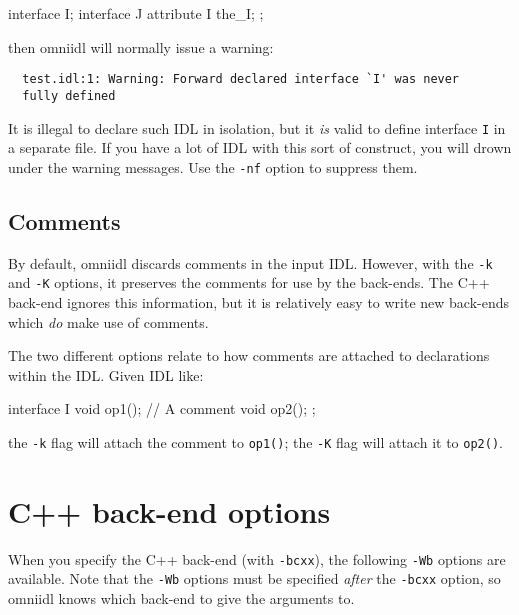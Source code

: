 \documentclass[11pt,twoside,a4paper]{book}
\newcommand{\intf}[1]{\texttt{#1}}
\newcommand{\op}[1]{\texttt{#1()}}
\newcommand{\cmdline}[1]{\texttt{#1}}
\begin{document}
\begin{idllisting}
interface I;
interface J {
  attribute I the_I;
};
\end{idllisting}

\noindent then omniidl will normally issue a warning:

{\small
\begin{verbatim}
  test.idl:1: Warning: Forward declared interface `I' was never
  fully defined
\end{verbatim}
}

\noindent It is illegal to declare such IDL in isolation, but it
\emph{is} valid to define interface \intf{I} in a separate file. If
you have a lot of IDL with this sort of construct, you will drown
under the warning messages. Use the \cmdline{-nf} option to suppress
them.


\subsection{Comments}

By default, omniidl discards comments in the input IDL. However, with
the \cmdline{-k} and \cmdline{-K} options, it preserves the comments
for use by the back-ends. The C++ back-end ignores this information,
but it is relatively easy to write new back-ends which \emph{do} make
use of comments.

The two different options relate to how comments are attached to
declarations within the IDL. Given IDL like:

\begin{idllisting}
interface I {
  void op1();
  // A comment
  void op2();
};
\end{idllisting}

\noindent the \cmdline{-k} flag will attach the comment to \op{op1};
the \cmdline{-K} flag will attach it to \op{op2}.



\section{C++ back-end options}

When you specify the C++ back-end (with \cmdline{-bcxx}), the
following \cmdline{-Wb} options are available. Note that the
\cmdline{-Wb} options must be specified \emph{after} the
\cmdline{-bcxx} option, so omniidl knows which back-end to give the
arguments to.
\end{document}
